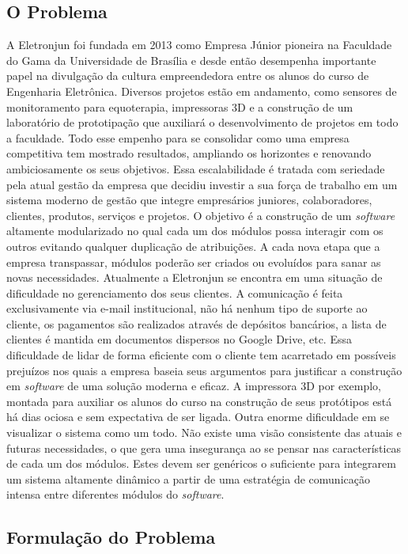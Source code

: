     \subsection{O Problema}
      A Eletronjun foi fundada em 2013 como Empresa Júnior pioneira na Faculdade do Gama da Universidade de Brasília e desde então desempenha importante papel na divulgação da cultura empreendedora entre os alunos do curso de Engenharia Eletrônica. Diversos projetos estão em andamento, como sensores de monitoramento para equoterapia, impressoras 3D e a construção de um laboratório de prototipação que auxiliará o desenvolvimento de projetos em todo a faculdade.
      Todo esse empenho para se consolidar como uma empresa competitiva tem mostrado resultados, ampliando os horizontes e renovando ambiciosamente os seus objetivos.
      Essa escalabilidade é tratada com seriedade pela atual gestão da empresa que decidiu investir a sua força de trabalho em um sistema moderno de gestão que integre empresários juniores, colaboradores, clientes, produtos, serviços e projetos. O objetivo é a construção de um \textit{software} altamente modularizado no qual cada um dos módulos possa interagir com os outros evitando qualquer duplicação de atribuições. A cada nova etapa que a empresa transpassar, módulos poderão ser criados ou evoluídos para sanar as novas necessidades.
      Atualmente a Eletronjun se encontra em uma situação de dificuldade no gerenciamento dos seus clientes. A comunicação é feita exclusivamente via e-mail institucional, não há nenhum tipo de suporte ao cliente, os pagamentos são realizados através de depósitos bancários, a lista de clientes é mantida em documentos dispersos no Google Drive, etc. Essa dificuldade de lidar de forma eficiente com o cliente tem acarretado em possíveis prejuízos nos quais a empresa baseia seus argumentos para justificar a construção em \textit{software} de uma solução moderna e eficaz. A impressora 3D por exemplo, montada para auxiliar os alunos do curso na construção de seus protótipos está há dias ociosa e sem expectativa de ser ligada.
      Outra enorme dificuldade em se visualizar o sistema como um todo. Não existe uma visão consistente das atuais e futuras necessidades, o que gera uma insegurança ao se pensar nas características de cada um dos módulos. Estes devem ser genéricos o suficiente para integrarem um sistema altamente dinâmico a partir de uma estratégia de comunicação intensa entre diferentes módulos do \textit{software}.
    \subsection{Formulação do Problema}

